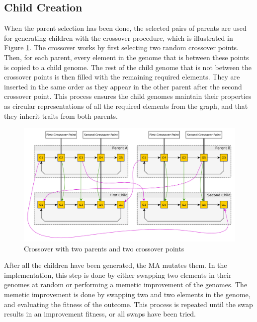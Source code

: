 
\subsection{Child Creation} %
\label{sub:achitecture_child_creation}

When the parent selection has been done, the selected pairs of parents are used for generating children with the crossover procedure, which is illustrated in Figure \ref{fig:crossover_illustration}. The crossover works by first selecting two random crossover points. Then, for each parent, every element in the genome that is between these points is copied to a child genome. The rest of the child genome that is not between the crossover points is then filled with the remaining required elements. They are inserted in the same order as they appear in the other parent after the second crossover point. This process ensures the child genomes maintain their properties as circular representations of all the required elements from the graph, and that they inherit traits from both parents.

\begin{figure}[thbp]
    \centerline{\includegraphics[width=\textwidth]{figures/Architecture/Crossover_Illustration.pdf}}
    \caption{Crossover with two parents and two crossover points}
    \label{fig:crossover_illustration}
\end{figure}

After all the children have been generated, the MA mutates them. In the implementation, this step is done by either swapping two elements in their genomes at random or performing a memetic improvement of the genomes. The memetic improvement is done by swapping two and two elements in the genome, and evaluating the fitness of the outcome. This process is repeated until the swap results in an improvement fitness, or all swaps have been tried.

